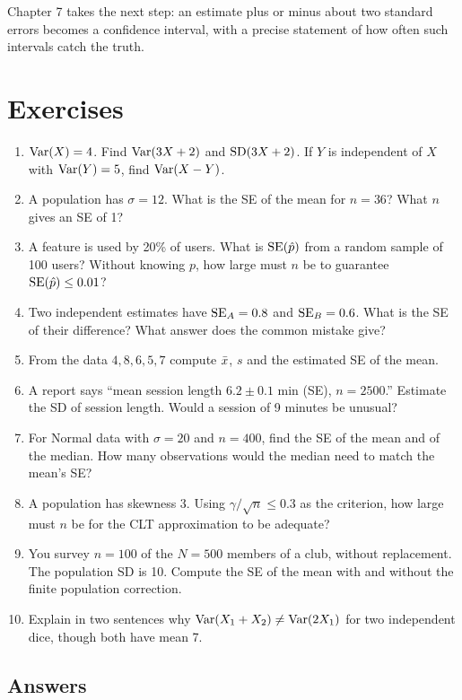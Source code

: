Chapter 7 takes the next step: an estimate plus or minus about two standard
errors becomes a confidence interval, with a precise statement of how often such
intervals catch the truth.

\section{Exercises}
\label{sec:sd-exercises}

\begin{enumerate}
  \item $\operatorname{Var}(X)=4$. Find $\operatorname{Var}(3X+2)$ and $\operatorname{SD}(3X+2)$. If $Y$ is independent of
  $X$ with $\operatorname{Var}(Y)=5$, find $\operatorname{Var}(X-Y)$.
  \item A population has $\sigma=12$. What is the SE of the mean for $n=36$? What
  $n$ gives an SE of 1?
  \item A feature is used by 20\% of users. What is $\operatorname{SE}(\hat p)$ from a random
  sample of 100 users? Without knowing $p$, how large must $n$ be to guarantee
  $\operatorname{SE}(\hat p)\le 0.01$?
  \item Two independent estimates have $\operatorname{SE}_A=0.8$ and $\operatorname{SE}_B=0.6$. What is the SE
  of their difference? What answer does the common mistake give?
  \item From the data $4, 8, 6, 5, 7$ compute $\bar{x}$, $s$ and the estimated SE of
  the mean.
  \item A report says ``mean session length $6.2\pm 0.1$ min (SE), $n=2500$.''
  Estimate the SD of session length. Would a session of 9 minutes be unusual?
  \item For Normal data with $\sigma=20$ and $n=400$, find the SE of the mean and of
  the median. How many observations would the median need to match the mean's
  SE?
  \item A population has skewness 3. Using $\gamma/\sqrt n\le 0.3$ as the criterion,
  how large must $n$ be for the CLT approximation to be adequate?
  \item You survey $n=100$ of the $N=500$ members of a club, without replacement.
  The population SD is 10. Compute the SE of the mean with and without the finite
  population correction.
  \item Explain in two sentences why $\operatorname{Var}(X_1+X_2)\neq\operatorname{Var}(2X_1)$ for two
  independent dice, though both have mean 7.
\end{enumerate}

\subsection*{Answers}

